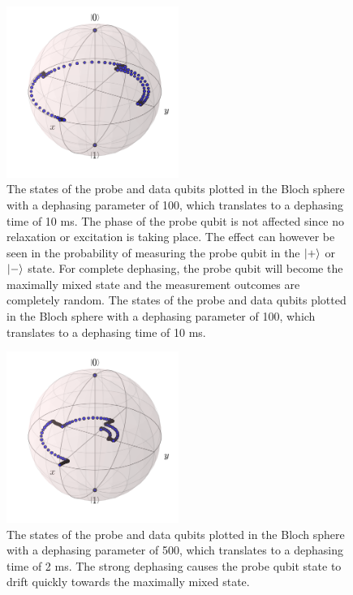 \begin{figure}[h]
  \centering
    \includegraphics[width=0.5\textwidth]{../Figures/Circ_orbit_odd_100_dephasing.png}
      \caption{The states of the probe and data qubits plotted in the Bloch sphere with a dephasing parameter of 100, which translates to a dephasing time of 10 ms. The phase of the probe qubit is not affected since no relaxation or excitation is taking place. The effect can however be seen in the probability of measuring the probe qubit in the $\ket{+}$ or $\ket{-}$ state. For complete dephasing, the probe qubit will become the maximally mixed state and the measurement outcomes are completely random. The states of the probe and data qubits plotted in the Bloch sphere with a dephasing parameter of 100, which translates to a dephasing time of 10 ms.}
      \label{fig:BlochsphereDephasing}
      
\end{figure}




\begin{figure}[!h]
  \centering
    \includegraphics[width=0.5\textwidth]{../Figures/Circ_orbit_odd_500_dephasing.png}
      \caption{The states of the probe and data qubits plotted in the Bloch sphere with a dephasing parameter of 500, which translates to a dephasing time of 2 ms. The strong dephasing causes the probe qubit state to drift quickly towards the maximally mixed state. }
      \label{fig:BlochsphereDephasing2}
\end{figure}



